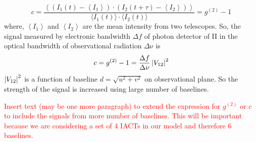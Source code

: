 \begin{equation}
	c = \frac{\left\langle \left( I_1(t) - \left\langle I_1 \right\rangle \right) \cdot \left( I_2(t + \tau) - \left\langle I_2 \right\rangle \right) \right\rangle}{\langle I_1(t) \rangle \cdot \langle I_2(t) \rangle} = g^{(2)} - 1
\end{equation}
where, $\left\langle I_1 \right\rangle$ and $\left\langle I_2 \right\rangle$ are the mean intensity from two telescopes. So, the signal measured by electronic bandwidth  $\Delta f$ of photon detector of II in the optical bandwidth of observational radiation $\Delta {\mathrm {\nu}}$ is
\begin{equation}
	c = g^{(2)} - 1 = \frac{\Delta f}{\Delta \nu} \left|V_{12}\right|^2
	\label{eq:signal}
\end{equation}
$\left|V_{12}\right|^2$ is a function of baseline $d = \sqrt{u^2 + v^2}$ on observational plane. So the strength of the signal is increased using large number of baselines.


\textcolor{red}{Insert text (may be one more paragraph) to extend the expression for $g^{(2)}$ or $c$ to include the signals from more number of baselines. This will be important because we are considering a set of 4 IACTs in our model and therefore 6 baselines.}


